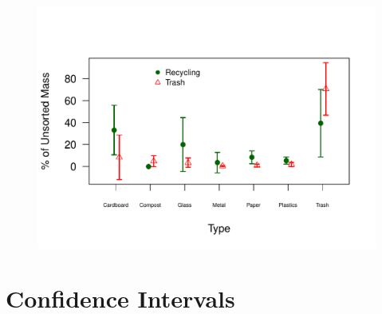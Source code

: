 \documentclass{tufte-handout}\usepackage[]{graphicx}\usepackage[]{color}
\makeatletter
\def\maxwidth{ %
  \ifdim\Gin@nat@width>\linewidth
    \linewidth
  \else
    \Gin@nat@width
  \fi
}
\newenvironment{kframe}{%
 \def\at@end@of@kframe{}%
 \ifinner\ifhmode%
  \def\at@end@of@kframe{\end{minipage}}%
  \begin{minipage}{\columnwidth}%
 \fi\fi%
 \def\FrameCommand##1{\hskip\@totalleftmargin \hskip-\fboxsep
 \colorbox{shadecolor}{##1}\hskip-\fboxsep
     \hskip-\linewidth \hskip-\@totalleftmargin \hskip\columnwidth}%
 \MakeFramed {\advance\hsize-\width
   \@totalleftmargin\z@ \linewidth\hsize
   \@setminipage}}%
 {\par\unskip\endMakeFramed%
 \at@end@of@kframe}
\newenvironment{knitrout}{}{} %
\makeatother
\begin{document}
\begin{figure}
\begin{knitrout}
\begin{kframe}
\begin{alltt}
\end{alltt}
\end{kframe}
\includegraphics[width=\maxwidth]{figure/unnamed-chunk-21-1} 

\end{knitrout}
\end{figure}


\section{Confidence Intervals}
\end{document}
